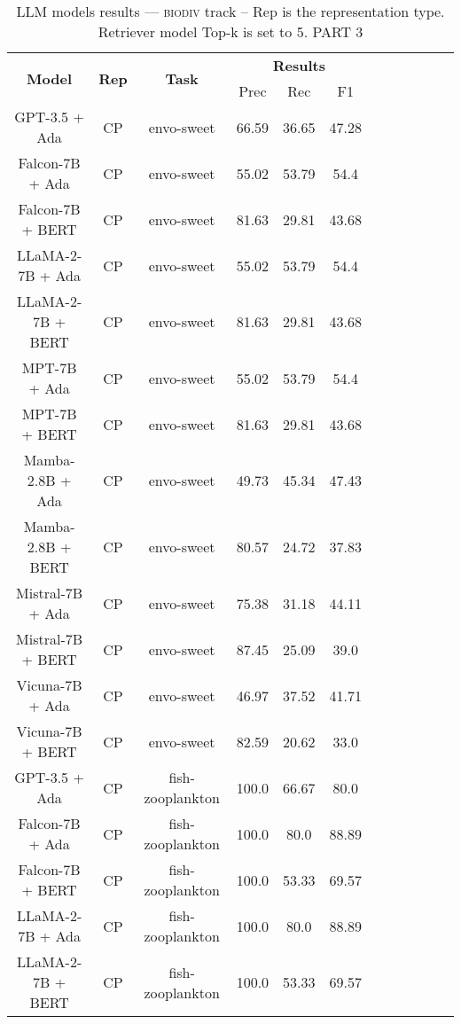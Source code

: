 \begin{table}
        \centering
        \small
        \caption{LLM models results --- \textsc{biodiv} track -- Rep is the representation type. Retriever model Top-k is set to 5. PART 3 } \label{tab:llm_biodiv3}
        \begin{tabular}{|c|c|c|c|c|c|c|c|c|c|c|c|}
            \hline
             \multirow{2}{*}{\textbf{Model}}  & \multirow{2}{*}{\textbf{Rep}}  & \multirow{2}{*}{\textbf{Task}} &  \multicolumn{3}{c|}{\textbf{Results}} \\
             \cline{4-6}
              & & & Prec & Rec & F1  \\
            \hline
	GPT-3.5 + Ada  & CP & envo-sweet  &  66.59 &  36.65 & 47.28  \\
	Falcon-7B + Ada  & CP & envo-sweet  &  55.02 &  53.79 & 54.4  \\
	Falcon-7B + BERT  & CP & envo-sweet  &  81.63 &  29.81 & 43.68  \\
	LLaMA-2-7B + Ada  & CP & envo-sweet  &  55.02 &  53.79 & 54.4  \\
	LLaMA-2-7B + BERT  & CP & envo-sweet  &  81.63 &  29.81 & 43.68  \\
	MPT-7B + Ada  & CP & envo-sweet  &  55.02 &  53.79 & 54.4  \\
	MPT-7B + BERT  & CP & envo-sweet  &  81.63 &  29.81 & 43.68  \\
	Mamba-2.8B + Ada  & CP & envo-sweet  &  49.73 &  45.34 & 47.43  \\
	Mamba-2.8B + BERT  & CP & envo-sweet  &  80.57 &  24.72 & 37.83  \\
	Mistral-7B + Ada  & CP & envo-sweet  &  75.38 &  31.18 & 44.11  \\
	Mistral-7B + BERT  & CP & envo-sweet  &  87.45 &  25.09 & 39.0  \\
	Vicuna-7B + Ada  & CP & envo-sweet  &  46.97 &  37.52 & 41.71  \\
	Vicuna-7B + BERT  & CP & envo-sweet  &  82.59 &  20.62 & 33.0  \\
	\hline
	GPT-3.5 + Ada  & CP & fish-zooplankton  &  100.0 &  66.67 & 80.0  \\
	Falcon-7B + Ada  & CP & fish-zooplankton  &  100.0 &  80.0 & 88.89  \\
	Falcon-7B + BERT  & CP & fish-zooplankton  &  100.0 &  53.33 & 69.57  \\
	LLaMA-2-7B + Ada  & CP & fish-zooplankton  &  100.0 &  80.0 & 88.89  \\
	LLaMA-2-7B + BERT  & CP & fish-zooplankton  &  100.0 &  53.33 & 69.57  \\

\end{tabular}
\end{table}
